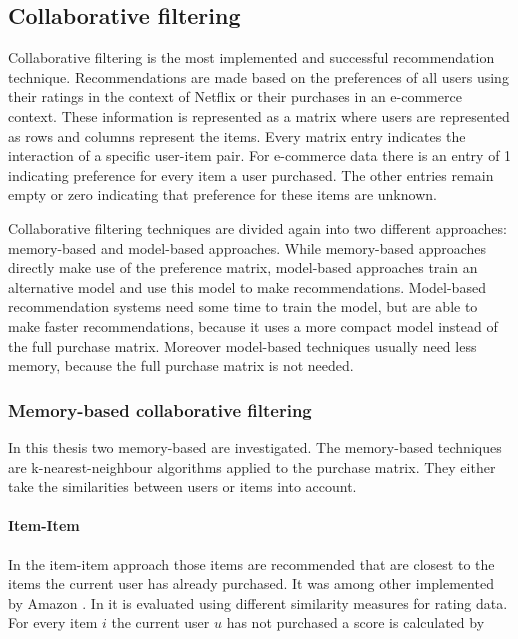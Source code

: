 \documentclass[10pt]{reportMaster}
\begin{document}
\subsection{Collaborative filtering}
\label{sec:collaborativeFiltering}
\label{rs_cf}

Collaborative filtering is the most implemented and successful recommendation technique.
Recommendations are made based on the preferences of all users using their ratings in the context of Netflix or their purchases in an e-commerce context.
These information is represented as a matrix where users are represented as rows and columns represent the items.
Every matrix entry indicates the interaction of a specific user-item pair.
For e-commerce data there is an entry of 1 indicating preference for every item a user purchased.
The other entries remain empty or zero indicating that preference for these items are unknown. %

Collaborative filtering techniques are divided again into two different approaches: memory-based and model-based approaches.
While memory-based approaches directly make use of the preference matrix, model-based approaches train an alternative model and use this model to make recommendations.
Model-based recommendation systems need some time to train the model, but are able to make faster recommendations, because it uses a more compact model instead of the full purchase matrix.
Moreover model-based techniques usually need less memory, because the full purchase matrix is not needed.

\subsubsection{Memory-based collaborative filtering}
\label{sec:memBasedCF}

In this thesis two memory-based are investigated.
The memory-based techniques are k-nearest-neighbour algorithms applied to the purchase matrix.
They either take the similarities between users or items into account.

\paragraph{Item-Item}
In the item-item approach those items are recommended that are closest to the items the current user has already purchased.
It was among other implemented by Amazon \cite{amazonItemItem}.
In \cite{itemItemAlgorithms} it is evaluated using different similarity measures for rating data. %
For every item $i$ the current user $u$ has not purchased a score is calculated by
\end{document}
